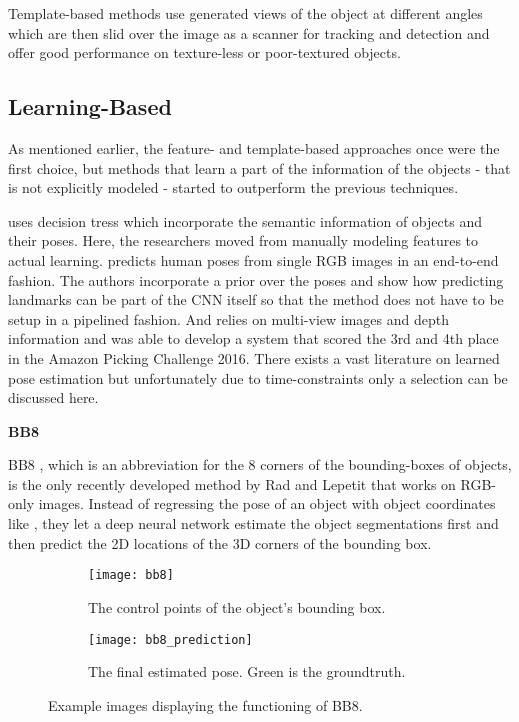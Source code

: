 Template-based methods \cite{hinterstoisser1, hinterstoisser2, rioscabrera, csteger} use generated views of the object at different angles which are then slid over the image as a scanner  for tracking and detection and offer good performance on texture-less or poor-textured objects. 

\subsection{Learning-Based}

As mentioned earlier, the feature- and template-based approaches once were the first choice, but methods that learn a part of the information of the objects - that is not explicitly modeled - started to outperform the previous techniques.

\cite{klai} uses decision tress which incorporate the semantic information of objects and their poses. Here, the researchers moved from manually modeling features to actual learning. \cite{dtome} predicts human poses from single RGB images in an end-to-end fashion. The authors incorporate a prior over the poses and show how predicting landmarks can be part of the CNN itself so that the method does not have to be setup in a pipelined fashion. And \cite{azeng} relies on multi-view images and depth information and was able to develop a system that scored the 3rd and 4th place in the Amazon Picking Challenge 2016. There exists a vast literature on learned pose estimation but unfortunately due to time-constraints only a selection can be discussed here.

\quad \textbf{BB8}

BB8 \cite{bb8}, which is an abbreviation for the 8 corners of the bounding-boxes of objects, is the only recently developed method by Rad and Lepetit that works on RGB-only images. Instead of regressing the pose of an object with object coordinates like \cite{brachmann1}, they let a deep neural network estimate the object segmentations first and then predict the 2D locations of the 3D corners of the bounding box. 

\begin{figure}[!tbp]
	\centering
	\begin{subfigure}[b]{0.45\textwidth}
		\centering
    	\texttt{[image: bb8]}
    	\caption{The control points of the object's bounding box. \cite{bb8}}
	\end{subfigure}
	\hfill
	\begin{subfigure}[b]{0.45\textwidth}
		\centering
    	\texttt{[image: bb8\_prediction]}
    	\caption{The final estimated pose. Green is the groundtruth. \cite{bb8}}
	\end{subfigure}
	\caption{Example images displaying the functioning of BB8. \cite{bb8}}
\end{figure}


